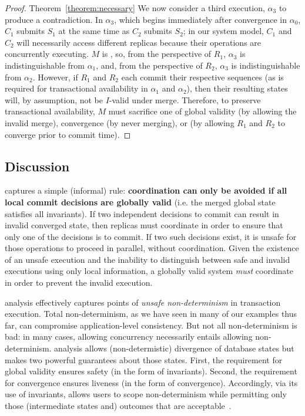 \begin{proof}{Theorem~\ref{theorem:necessary}}
   We now consider a third execution, $\alpha_3$ to produce a
   contradiction. In $\alpha_3$, which begins immediately after
   convergence in $\alpha_0$, $C_1$ submits $S_1$ at the same time as
   $C_2$ submits $S_2$; in our system model, $C_1$ and $C_2$ will
   necessarily access different replicas because their operations are
   concurrently executing. $M$ is \cfree, so, from the perspective of
   $R_1$, $\alpha_3$ is indistinguishable from $\alpha_1$, and, from
   the perspective of $R_2$, $\alpha_3$ is indistinguishable from
   $\alpha_2$. However, if $R_1$ and $R_2$ each commit their
   respective sequences (as is required for transactional availability
   in $\alpha_1$ and $\alpha_2$), then their resulting states will, by
   assumption, not be $I$-valid under merge. Therefore, to preserve
   transactional availability, $M$ must sacrifice one of global
   validity (by allowing the invalid merge), convergence (by never
   merging), or \cfreedom (by allowing $R_1$ and $R_2$ to converge
   prior to commit time).
\end{proof}

\subsection{Discussion}

\iconfluence captures a simple (informal) rule: \textbf{coordination
  can only be avoided if all local commit decisions are globally
  valid} (i.e. the merged global state satisfies all invariants). If
two independent decisions to commit can result in invalid converged
state, then replicas must coordinate in order to ensure that only one
of the decisions is to commit. If two such decisions exist, it is
unsafe for those operations to proceed in parallel, without
coordination. Given the existence of an unsafe execution and the
inability to distinguish between safe and invalid executions using
only local information, a globally valid system \textit{must}
coordinate in order to prevent the invalid execution.

\iconfluence analysis effectively captures points of \textit{unsafe
  non-determinism} in transaction execution. Total non-determinism, as
we have seen in many of our examples thus far, can compromise
application-level consistency. But not all non-determinism is bad: in
many cases, allowing concurrency necessarily entails allowing
non-determinism. \iconfluence analysis allows (non-determistic)
divergence of database states but makes two powerful guarantees about
those states. First, the requirement for global validity ensures
safety (in the form of invariants). Second, the requirement for
convergence ensures liveness (in the form of
convergence). Accordingly, via its use of invariants, \iconfluence
allows users to scope non-determinism while permitting only those
(intermediate states and) outcomes that are
acceptable~\cite{consistency-borders}.

